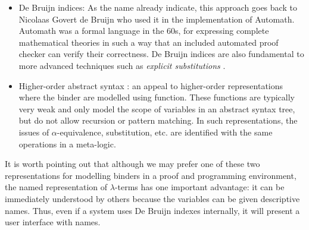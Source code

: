 \begin{itemize}
\item De Bruijn indices: As the name already indicate, this approach
  goes back to Nicolaas Govert de Bruijn who used it in the
  implementation of Automath. Automath was a formal language in the
  60s, for expressing complete mathematical theories in such a way
  that an included automated proof checker can verify their
  correctness. De Bruijn indices are also fundamental to more advanced
  techniques such as \emph{explicit substitutions}
  \cite{Abadi:POPL90}.

\item Higher-order abstract syntax
  \cite{Pfenning88pldi}: an appeal to
  higher-order representations where the binder are modelled using 
  function. These functions are typically very weak and only model the
  scope of variables in an abstract syntax tree, but do not allow recursion or pattern
  matching. In such representations, the issues of
  $\alpha$-equivalence, substitution, etc. are identified with the 
  same operations in a meta-logic.
\end{itemize}

It is worth pointing out that although we may prefer one of these two
representations for modelling binders in a proof and programming environment, the named
representation of $\lambda$-terms has one important advantage: it can be 
immediately understood by others because the variables can be
given descriptive names. Thus, even if a system uses De Bruijn indexes
internally, it will present a user interface with names.





